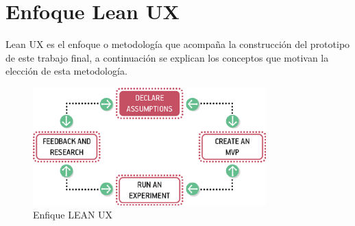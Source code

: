 \section{Enfoque Lean UX}

Lean UX \cite{Gothelf2013} es el enfoque o metodología que acompaña la construcción del prototipo de este trabajo final, a continuación se explican los conceptos que motivan la elección de esta metodología.


\begin{figure}
\centering
\includegraphics[width=9cm]{Img/UX/UX-0.png}
\caption[(optional short caption)]{\label{us_figure} Enfique LEAN UX}
\end{figure}

